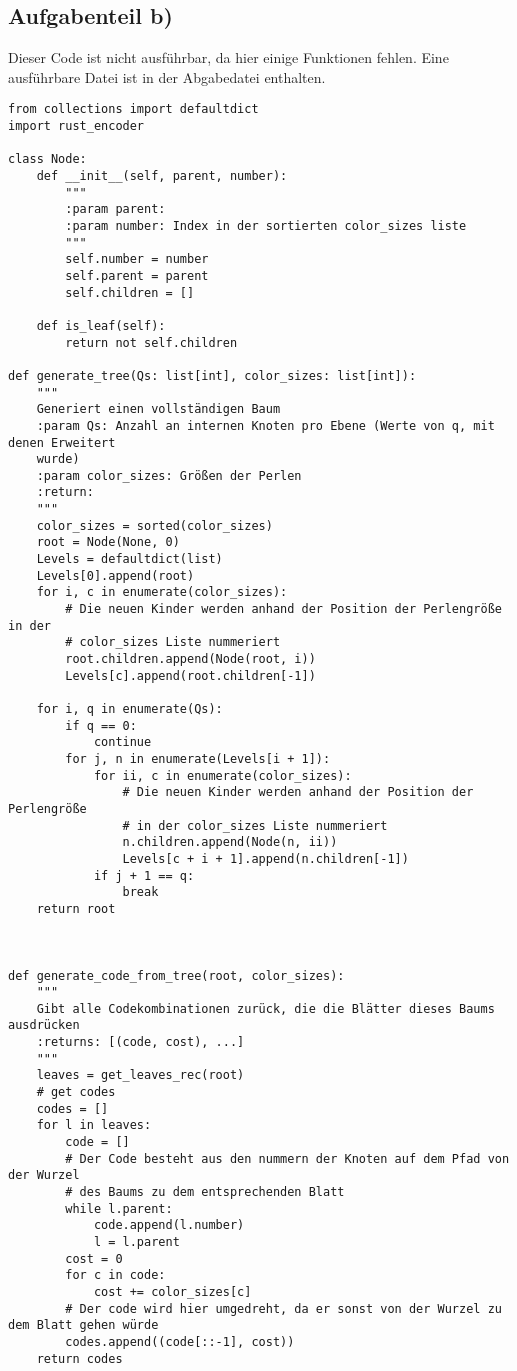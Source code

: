 \documentclass[a4paper,10pt,ngerman]{scrartcl}
\begin{document}
    \subsection{Aufgabenteil b)}
    Dieser Code ist nicht ausführbar, da hier einige Funktionen fehlen.
    Eine ausführbare Datei ist in der Abgabedatei enthalten.
    \begin{verbatim}
from collections import defaultdict
import rust_encoder

class Node:
    def __init__(self, parent, number):
        """
        :param parent:
        :param number: Index in der sortierten color_sizes liste
        """
        self.number = number
        self.parent = parent
        self.children = []

    def is_leaf(self):
        return not self.children

def generate_tree(Qs: list[int], color_sizes: list[int]):
    """
    Generiert einen vollständigen Baum
    :param Qs: Anzahl an internen Knoten pro Ebene (Werte von q, mit denen Erweitert
    wurde)
    :param color_sizes: Größen der Perlen
    :return:
    """
    color_sizes = sorted(color_sizes)
    root = Node(None, 0)
    Levels = defaultdict(list)
    Levels[0].append(root)
    for i, c in enumerate(color_sizes):
        # Die neuen Kinder werden anhand der Position der Perlengröße in der
        # color_sizes Liste nummeriert
        root.children.append(Node(root, i))
        Levels[c].append(root.children[-1])

    for i, q in enumerate(Qs):
        if q == 0:
            continue
        for j, n in enumerate(Levels[i + 1]):
            for ii, c in enumerate(color_sizes):
                # Die neuen Kinder werden anhand der Position der Perlengröße
                # in der color_sizes Liste nummeriert
                n.children.append(Node(n, ii))
                Levels[c + i + 1].append(n.children[-1])
            if j + 1 == q:
                break
    return root



def generate_code_from_tree(root, color_sizes):
    """
    Gibt alle Codekombinationen zurück, die die Blätter dieses Baums ausdrücken
    :returns: [(code, cost), ...]
    """
    leaves = get_leaves_rec(root)
    # get codes
    codes = []
    for l in leaves:
        code = []
        # Der Code besteht aus den nummern der Knoten auf dem Pfad von der Wurzel
        # des Baums zu dem entsprechenden Blatt
        while l.parent:
            code.append(l.number)
            l = l.parent
        cost = 0
        for c in code:
            cost += color_sizes[c]
        # Der code wird hier umgedreht, da er sonst von der Wurzel zu dem Blatt gehen würde
        codes.append((code[::-1], cost))
    return codes



\end{verbatim}
\end{document}

